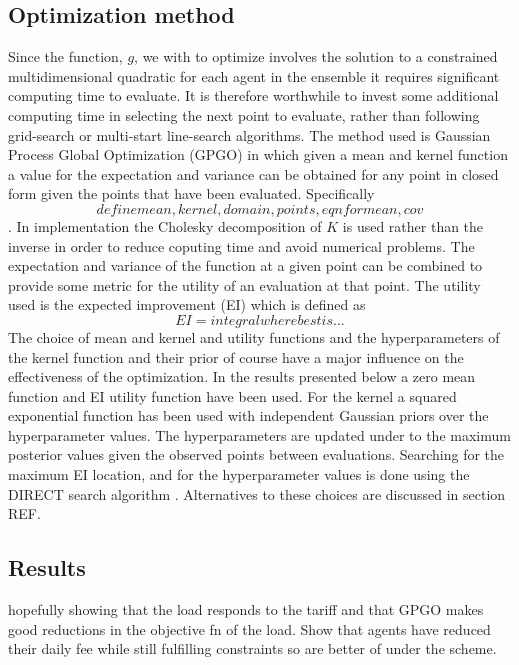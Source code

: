 \documentclass[a4paper, 10 pt, conference]{ieeeconf}  %
\begin{document}
\subsection{Optimization method}
Since the function, $g$, we with to optimize involves the solution to a constrained multidimensional quadratic for each agent in the ensemble it requires significant computing time to evaluate. It is therefore worthwhile to invest some additional computing time in selecting the next point to evaluate, rather than following grid-search or multi-start line-search algorithms. The method used is Gaussian Process Global Optimization (GPGO)\cite{garnettgaussian} in which given a mean and kernel function a value for the expectation and variance can be obtained for any point in closed form given the points that have been evaluated. Specifically
\begin{equation}
define mean, kernel,domain, points, eqn for mean, cov 
\end{equation}.
In implementation the Cholesky decomposition of $K$ is used rather than the inverse in order to reduce coputing time and avoid numerical problems. The expectation and variance of the function at a given point can be combined to provide some metric for the utility of an evaluation at that point. The utility used is the expected improvement (EI) which is defined as
\begin{equation}
EI=integral where best is...
\end{equation}
The choice of mean and kernel and utility functions and the hyperparameters of the kernel function and their prior of course have a major influence on the effectiveness of the optimization. In the results presented below a zero mean function and EI utility function have been used. For the kernel a squared exponential function has been used with independent Gaussian priors over the hyperparameter values. The hyperparameters are updated under to the maximum posterior values given the observed points between evaluations. Searching for the maximum EI location, and for the hyperparameter values is done using the DIRECT search algorithm \cite{jones1993lipschitzian}. Alternatives to these choices are discussed in section REF.
\subsection{Results}
hopefully showing that the load responds to the tariff and that GPGO makes good reductions in the objective fn of the load. Show that agents have reduced their daily fee while still fulfilling constraints so are better of under the scheme.
\onecolumn
\end{document}
